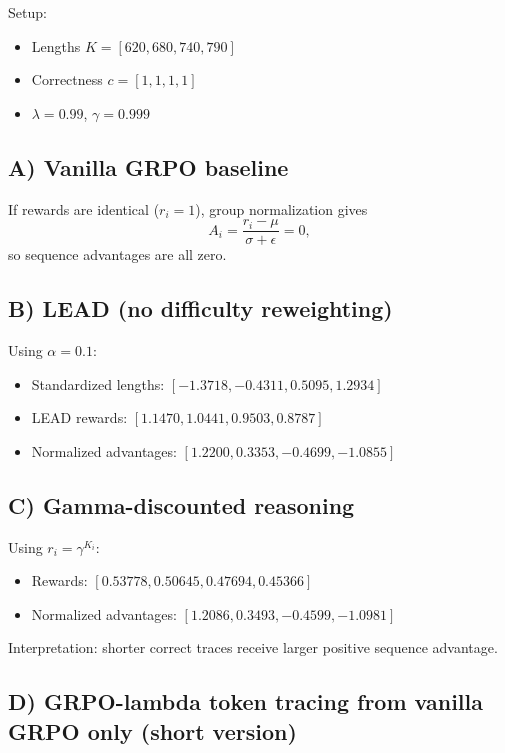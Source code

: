 \documentclass[11pt]{article}
\begin{document}
Setup:

\begin{itemize}
\item Lengths $K=[620,680,740,790]$
\item Correctness $c=[1,1,1,1]$
\item $\lambda=0.99$, $\gamma=0.999$
\end{itemize}

\subsection*{A) Vanilla GRPO baseline}

If rewards are identical ($r_i=1$), group normalization gives
\begin{equation}
A_i = \frac{r_i-\mu}{\sigma+\epsilon} = 0,
\end{equation}
so sequence advantages are all zero.

\subsection*{B) LEAD (no difficulty reweighting)}

Using $\alpha=0.1$:

\begin{itemize}
\item Standardized lengths: $[-1.3718,-0.4311,0.5095,1.2934]$
\item LEAD rewards: $[1.1470,1.0441,0.9503,0.8787]$
\item Normalized advantages: $[1.2200,0.3353,-0.4699,-1.0855]$
\end{itemize}

\subsection*{C) Gamma-discounted reasoning}

Using $r_i=\gamma^{K_i}$:

\begin{itemize}
\item Rewards: $[0.53778,0.50645,0.47694,0.45366]$
\item Normalized advantages: $[1.2086,0.3493,-0.4599,-1.0981]$
\end{itemize}

Interpretation: shorter correct traces receive larger positive sequence advantage.

\subsection*{D) GRPO-lambda token tracing from vanilla GRPO only (short version)}
\end{document}
